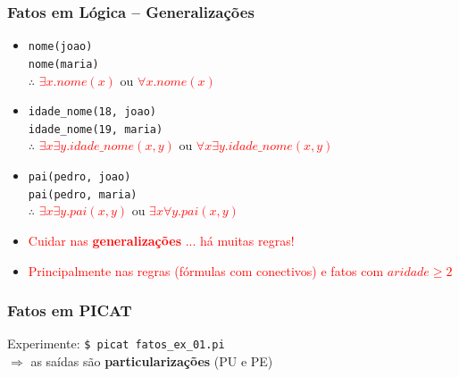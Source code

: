 \documentclass[10pt]{beamer}
\begin{document}
\begin{frame}
    \frametitle{Fatos em Lógica  -- Generalizações}
    
    \begin{itemize}
    \item \texttt{nome(joao)}\\ 
     \texttt{nome(maria)}\\ 
      $\therefore $ \textcolor{red}{$\exists x . nome(x)$} 
      ou \textcolor{red}{$\forall x . nome(x)$} 
    
    \item \texttt{idade\_nome(18, joao)}\\ 
     \texttt{idade\_nome(19, maria)}\\ 
       $\therefore $ \textcolor{red}{$\exists x \exists y . idade\_nome(x,y)$} ou \textcolor{red}{$\forall x \exists y . idade\_nome(x,y)$} 
    
    \item \texttt{pai(pedro, joao)}\\ 
    \texttt{pai(pedro, maria)}\\ 
    $\therefore $ \textcolor{red}{$\exists x \exists y . pai(x,y)$} ou \textcolor{red}{$\exists x \forall y . pai(x,y)$}
    \pause
    
    \item \textcolor{red}{Cuidar nas \textbf{generalizações} ... há muitas regras!}
    \item \textcolor{red}{Principalmente nas regras (fórmulas com conectivos) e fatos com $aridade \ge 2$} 
    
        \end{itemize}
\end{frame}


\begin{frame}[allowframebreaks=0.9]
 \frametitle{Fatos em PICAT}



Experimente: \texttt{\$ picat fatos\_ex\_01.pi}\\

$\Rightarrow $ as saídas são \textbf{particularizações} (PU e PE)

\end{frame}

\end{document}

